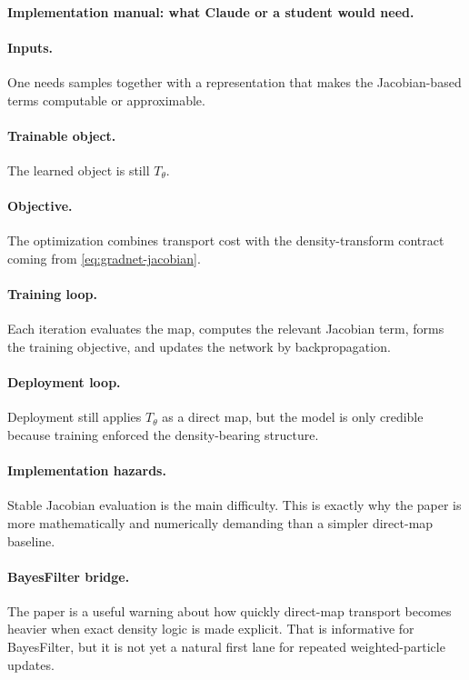 \documentclass[11pt]{report}
\begin{document}
\paragraph{Implementation manual: what Claude or a student would need.}
\paragraph{Inputs.}
One needs samples together with a representation that makes the Jacobian-based terms
computable or approximable.

\paragraph{Trainable object.}
The learned object is still $T_\theta$.

\paragraph{Objective.}
The optimization combines transport cost with the density-transform contract coming
from \eqref{eq:gradnet-jacobian}.

\paragraph{Training loop.}
Each iteration evaluates the map, computes the relevant Jacobian term, forms the
training objective, and updates the network by backpropagation.

\paragraph{Deployment loop.}
Deployment still applies $T_\theta$ as a direct map, but the model is only credible
because training enforced the density-bearing structure.

\paragraph{Implementation hazards.}
Stable Jacobian evaluation is the main difficulty.  This is exactly why the paper is
more mathematically and numerically demanding than a simpler direct-map baseline.

\paragraph{BayesFilter bridge.}
The paper is a useful warning about how quickly direct-map transport becomes heavier
when exact density logic is made explicit.  That is informative for BayesFilter, but
it is not yet a natural first lane for repeated weighted-particle updates.
\end{document}
